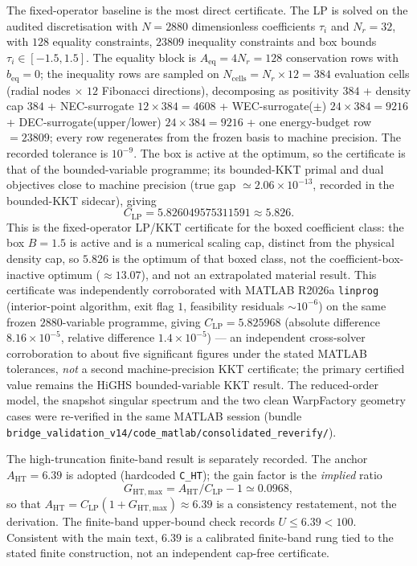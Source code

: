 \documentclass[11pt,a4paper]{article}
\begin{document}
The fixed-operator baseline is the most direct certificate. The LP is solved on the audited discretisation with $N=2880$ dimensionless coefficients $\tau_{i}$ and $N_{r}=32$, with $128$ equality constraints, $23809$ inequality constraints and box bounds $\tau_{i}\in[-1.5,1.5]$. The equality block is $A_{\mathrm{eq}}=4N_{r}=128$ conservation rows with $b_{\mathrm{eq}}=0$; the inequality rows are sampled on $N_{\mathrm{cells}}=N_{r}\times12=384$ evaluation cells (radial nodes $\times$ $12$ Fibonacci directions), decomposing as positivity $384$ + density cap $384$ + NEC-surrogate $12\times384=4608$ + WEC-surrogate($\pm$) $24\times384=9216$ + DEC-surrogate(upper/lower) $24\times384=9216$ + one energy-budget row $=23809$; every row regenerates from the frozen basis to machine precision. The recorded tolerance is $10^{-9}$. The box is active at the optimum, so the certificate is that of the bounded-variable programme; its bounded-KKT primal and dual objectives close to machine precision (true gap $\simeq2.06\times10^{-13}$, recorded in the bounded-KKT sidecar), giving
\[
C_{\mathrm{LP}} = 5.826049575311591 \approx 5.826.
\]
This is the fixed-operator LP/KKT certificate for the boxed coefficient class: the box $B=1.5$ is active and is a numerical scaling cap, distinct from the physical density cap, so $5.826$ is the optimum of that boxed class, not the coefficient-box-inactive optimum ($\approx13.07$), and not an extrapolated material result. This certificate was independently corroborated with MATLAB R2026a \texttt{linprog} (interior-point algorithm, exit flag $1$, feasibility residuals $\sim10^{-6}$) on the same frozen $2880$-variable programme, giving $C_{\mathrm{LP}}=5.825968$ (absolute difference $8.16\times10^{-5}$, relative difference $1.4\times10^{-5}$) --- an independent cross-solver corroboration to about five significant figures under the stated MATLAB tolerances, \emph{not} a second machine-precision KKT certificate; the primary certified value remains the HiGHS bounded-variable KKT result. The reduced-order model, the snapshot singular spectrum and the two clean WarpFactory geometry cases were re-verified in the same MATLAB session (bundle \texttt{bridge\_validation\_v14/code\_matlab/consolidated\_reverify/}).

The high-truncation finite-band result is separately recorded. The anchor $A_{\mathrm{HT}}=6.39$ is adopted (hardcoded \texttt{C\_HT}); the gain factor is the \emph{implied} ratio
\[
G_{\mathrm{HT,max}} = A_{\mathrm{HT}}/C_{\mathrm{LP}}-1 \simeq 0.0968,
\]
so that $A_{\mathrm{HT}} = C_{\mathrm{LP}}(1+G_{\mathrm{HT,max}}) \approx 6.39$ is a consistency restatement, not the derivation.
The finite-band upper-bound check records $U\leq6.39<100$. Consistent with the main text, $6.39$ is a calibrated finite-band rung tied to the stated finite construction, not an independent cap-free certificate.
\end{document}
